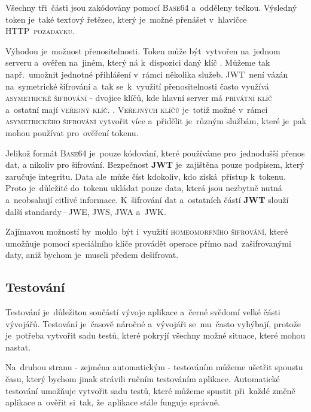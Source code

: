 \documentclass[14pt,a4paper]{article}
\begin{document}
            Všechny tři~části jsou zakódovány pomocí \textsc{Base64} a~odděleny tečkou. Výsledný token je~také textový řetězec, který je~možné přenášet v~hlavičce \textsc{HTTP~požadavku}.

            Výhodou je~možnost přenositelnosti. Token může být~vytvořen na~jednom serveru a~ověřen na~jiném, který ná k~dispozici daný klíč \parencite{ieee:jwt}. Můžeme tak např.~umožnit jednotné přihlášení v~rámci několika služeb. JWT~není vázán na~symetrické šifrování a~tak se~k~využití přenositelnosti často využívá \textsc{asymetrické šifrování} - dvojice klíčů, kde hlavní server má \textsc{privátní klíč} a~ostatní mají \textsc{veřejný klíč}. \parencite{miguelgrinbergJSONTokens}. \textsc{Veřejných klíčů} je~totiž možné v~rámci \textsc{asymetrického šifrování} vytvořit více a~přidělit je~různým službám, které je~pak mohou používat pro~ověření tokenu.

            Jelikož formát \textsc{Base64} je~pouze kódování, které používáme pro~jednodušší přenos dat, a nikoliv pro šifrování. Bezpečnost \textbf{JWT} je~zajištěna pouze podpisem, který zaručuje integritu. Data ale~může číst kdokoliv, kdo získá~přístup k~tokenu. Proto je~důležité do~tokenu ukládat pouze data, která jsou nezbytně nutná a~neobsahují citlivé informace. K~šifrování dat a~ostatních částí \textbf{JWT} slouží další standardy\,--\,\textsc{JWE}, \textsc{JWS}, \textsc{JWA} a~\textsc{JWK}. \parencite{jwtesak}

            Zajímavou možností by~mohlo~být i~využití \textsc{homeomorfního šifrování}, které umožňuje pomocí speciálního klíče provádět operace přímo nad~zašifrovanými daty, aniž bychom je~museli předem dešifrovat. \parencite{homeomorphicEncryption}


        \subsection{Testování}
        Testování je~důležitou součástí vývoje aplikace a~černé svědomí velké části vývojářů. Testování je~časově náročné a~vývojáři se~mu~často vyhýbají, protože je~potřeba vytvořit sadu testů, které pokryjí všechny možné situace, které mohou nastat.
        
        Na~druhou stranu - zejména automatickým - testováním můžeme ušetřit spoustu času, který bychom jinak strávili ručním testováním aplikace. Automatické testování umožňuje vytvořit sadu testů, které můžeme spustit při~každé změně aplikace a~ověřit si~tak, že~aplikace stále funguje správně.
        
\end{document}
